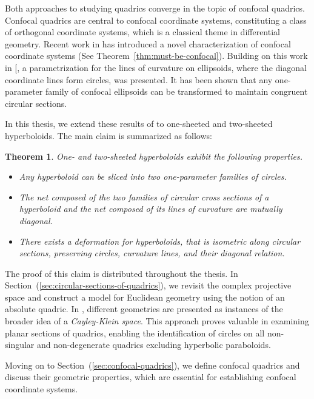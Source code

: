 \documentclass[10pt, a4paper]{article}
\makeatletter
\theoremstyle{BoldTopSpacing}
\newtheorem{theorem}{Theorem}[section]
\theoremstyle{BoldTopSpacing}
\theoremstyle{BoldTopSpacing}
\theoremstyle{BoldTopBottomSpacing}
\theoremstyle{BoldTopSpacing}
\theoremstyle{BoldTopBottomSpacing}
\theoremstyle{remark}
\newcommand{\citecomment}[2][]{\citen{#2}#1\citevar}
\newcommand{\citeone}[1]{\citecomment{#1}}
\newcommand{\citetwo}[2][]{\citecomment[,~#1]{#2}}
\newcommand{\citevar}{\@ifnextchar\bgroup{;~\citeone}{\@ifnextchar[{;~\citetwo}{]}}}
\newcommand{\citefirst}{\@ifnextchar\bgroup{\citeone}{\@ifnextchar[{\citetwo}{]}}}
\newcommand{\cites}{[\citefirst}
\makeatother
\begin{document}
Both approaches to studying quadrics converge in the topic of confocal quadrics. Confocal quadrics are central to confocal coordinate systems, constituting a class of orthogonal coordinate systems, which is a classical theme in differential geometry. Recent work in \cite{DiscretizationConfocalQuadricsI} has introduced a novel characterization of confocal coordinate systems (See Theorem~\ref{thm:must-be-confocal}). Building on this work in \cites{MutuallyDiagonalNets2019}{geometryIII}, a parametrization for the lines of curvature on ellipsoids, where the diagonal coordinate lines form circles, was presented. It has been shown that any one-parameter family of confocal ellipsoids can be transformed to maintain congruent circular sections. \par
In this thesis, we extend these results of to one-sheeted and two-sheeted hyperboloids. The main claim is summarized as follows:
\begin{theorem}
\label{thm:main-result}
One- and two-sheeted hyperboloids exhibit the following properties.
\begin{itemize}
    \item Any hyperboloid can be sliced into two one-parameter families of circles.
    \item The net composed of the two families of circular cross sections of a hyperboloid and the net composed of its lines of curvature are mutually diagonal.
    \item There exists a deformation for hyperboloids, that is isometric along circular sections, preserving circles, curvature lines, and their diagonal relation.
\end{itemize}
\end{theorem}
\vspace{0.7em}
The proof of this claim is distributed throughout the thesis. In Section~(\ref{sec:circular-sections-of-quadrics}), we revisit the complex projective space and construct a model for Euclidean geometry using the notion of an absolute quadric. In \cite{bobenkoNonEuclideanLaguerreGeometry}, different geometries are presented as instances of the broader idea of a \textit{Cayley-Klein space}. This approach proves valuable in examining planar sections of quadrics, enabling the identification of circles on all non-singular and non-degenerate quadrics \textemdash excluding hyperbolic paraboloids. \par
Moving on to Section~(\ref{sec:confocal-quadrics}), we define confocal quadrics and discuss their geometric properties, which are essential for establishing confocal coordinate systems. \par
\end{document}
